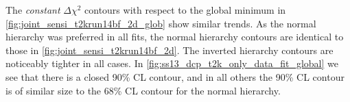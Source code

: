 The \emph{constant} $\Delta \chi^2$ contours with respect to the global minimum in \cref{fig:joint_sensi_t2krun14bf_2d_glob} show similar trends. 
As the normal hierarchy was preferred in all fits, the normal hierarchy contours are identical to those in \cref{fig:joint_sensi_t2krun14bf_2d}. 
The inverted hierarchy contours are noticeably tighter in all cases. 
In \cref{fig:ss13_dcp_t2k_only_data_fit_global} we see that there is a closed 
90\% CL
contour, 
and in all others the 
90\% CL
contour is of similar size to the 
68\% CL
contour for the normal hierarchy. 

%

